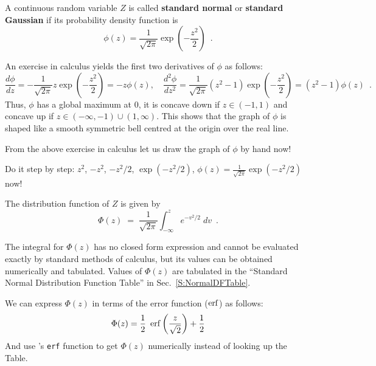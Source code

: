 \begin{framed}
\begin{model}\label{Df:StandardNormal} 
A continuous random variable $Z$ is called \textbf{standard normal} or {\bf standard Gaussian} 
if its probability density function is
\begin{equation}\label{E:StandardNormalPdf}
\phi(z) = \frac{1}{\sqrt{2\pi}} \exp{\left( -\frac{z^2}{2}\right)} \enspace.
\end{equation}
\end{model}
\end{framed}

An exercise in calculus yields the first two derivatives of $\phi$ as follows:
\[
\frac{d \phi}{dz} = - \frac{1}{\sqrt{2\pi}}z \exp{\left( -\frac{z^2}{2}\right)}=-z\phi(z), \quad
\frac{d^2 \phi}{dz^2} = \frac{1}{\sqrt{2\pi}}(z^2-1) \exp{\left(-\frac{z^2}{2} \right)}=(z^2-1)\phi(z) \enspace .
\]
Thus, $\phi$ has a global maximum at $0$, it is concave down if $z \in (-1,1)$ and concave up if $z \in (-\infty,-1) \cup (1,\infty)$.  
This shows that the graph of $\phi$ is shaped like a smooth symmetric bell centred at the origin over the real line.


\begin{classwork}\label{xDrawPDFOfStdNormal}
From the above exercise in calculus let us draw the graph of $\phi$ by hand now!

Do it step by step: $z^2$, $-z^2$, $-z^2/2$, $\exp(-z^2/2)$, $\phi(z) = \frac{1}{\sqrt{2\pi}} \exp(-z^2/2)$ now! 
\vspace*{20mm}
\end{classwork}

The distribution function of $Z$ is given by
\begin{equation}\label{E:StandardNormalDF}
\Phi(z) \;=\;\frac{1}{\sqrt{2\pi}}\int^z_{-\infty}e^{-v^2/2}\;dv \enspace .
\end{equation}

\begin{rem}
{The integral for $\Phi(z)$ has no closed form expression and cannot be evaluated exactly by standard methods of calculus, but its values can be
obtained numerically and tabulated.  Values of $\Phi(z)$ are tabulated in the ``Standard Normal Distribution Function Table'' in Sec.~\ref{S:NormalDFTable}.}

We can express $\Phi(z)$ %
in terms of the error function ($\operatorname{erf}$) as follows:
\begin{equation}\label{E:DFStandardNormalviaErf}
\Phi(z) = \frac{1}{2} \ \operatorname{erf} \left(  \frac{z}{\sqrt{2}} \right)+ \frac{1}{2}
\end{equation}
And use \Matlab's \texttt{erf} function to get $\Phi(z)$ numerically instead of looking up the Table.
\end{rem}

